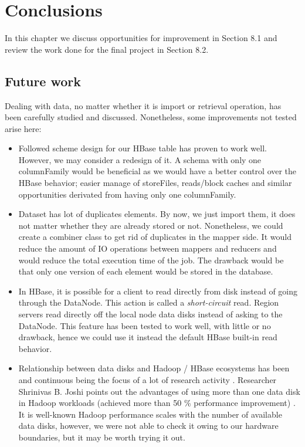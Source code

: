 \chapter{Conclusions}
\label{chapter:conclusions}

In this chapter we discuss opportunities for improvement in Section 8.1 and review the work done for the final project in Section 8.2.

\section{Future work}

Dealing with data, no matter whether it is import or retrieval operation, has been carefully studied and discussed. Nonetheless, some improvements not tested arise here:
\begin{itemize}
\item Followed scheme design for our HBase table has proven to work well. However, we may consider a redesign of it. A schema with only one columnFamily would be beneficial as we would have a better control over the HBase behavior; easier manage of storeFiles, reads/block caches and similar opportunities derivated from having only one columnFamily. 
\item Dataset has lot of duplicates elements. By now, we just import them, it does not matter whether they are already stored or not. Nonetheless, we could create a combiner class to get rid of duplicates in the mapper side. It would reduce the amount of IO operations between mappers and reducers and would reduce the total execution time of the job. The drawback would be that only one version of each element would be stored in the database.
\item In HBase, it is possible for a client to read directly from disk instead of going through the DataNode. This action is called a \textit{short-circuit} read. Region servers read directly off the local node data disks instead of asking to the DataNode. This feature has been tested to work well, with little or no drawback, hence we could use it instead the default HBase built-in read behavior.
\item Relationship between data disks and Hadoop / HBase ecosystems has been and continuous being the focus of a lot of research activity \cite{kangcase} \cite{fan2009diskreduce} \cite{awasthi2012hybrid}. Researcher Shrinivas B. Joshi points out the advantages of using more than one data disk in Hadoop workloads (achieved more than 50 \% performance improvement) \cite{joshi2012apache}. It is well-known Hadoop performance scales with the number of available data disks, however, we were not able to check it owing to our hardware boundaries, but it may be worth trying it out. 
\end{itemize}


